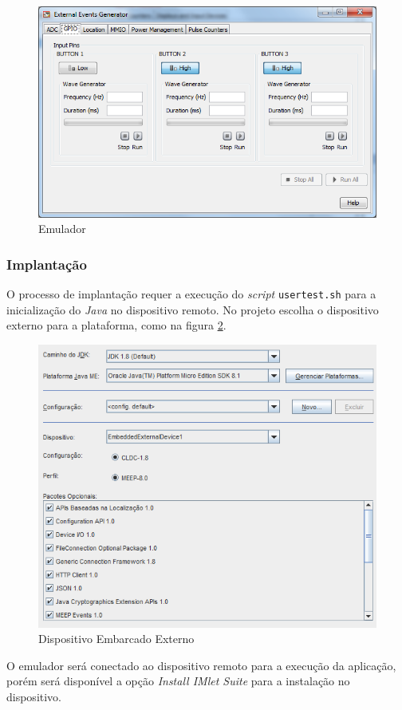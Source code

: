 \begin{figure}[H]
    \centering
    \includegraphics[width=0.7\linewidth]{figuras/java/java-me-external-events-generator.png}
    \caption{Emulador}
    \label{fig:java-me/external-events-generator}
\end{figure}

\subsubsection{Implantação}

O processo de implantação requer a execução do \textit{script}
\verb|usertest.sh| para a inicialização do \textit{Java} no dispositivo remoto.
No projeto escolha o dispositivo externo para a plataforma, como na figura
\ref{fig:java-me/plataform}.

\begin{figure}[H]
    \centering
    \includegraphics[width=0.7\linewidth]{figuras/java/java-me-plataform.png}
    \caption{Dispositivo Embarcado Externo}
    \label{fig:java-me/plataform}
\end{figure}

O emulador será conectado ao dispositivo remoto para a execução da aplicação,
porém será disponível a opção \textit{Install IMlet Suite} para a instalação no
dispositivo.

